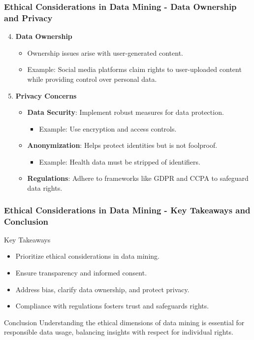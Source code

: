 \documentclass{beamer}
\begin{document}
\begin{frame}[fragile]
    \frametitle{Ethical Considerations in Data Mining - Data Ownership and Privacy}
    \begin{enumerate}
        \setcounter{enumi}{3}
        \item \textbf{Data Ownership}
            \begin{itemize}
                \item Ownership issues arise with user-generated content.
                \item Example: Social media platforms claim rights to user-uploaded content while providing control over personal data.
            \end{itemize}
        \item \textbf{Privacy Concerns}
            \begin{itemize}
                \item \textbf{Data Security}: Implement robust measures for data protection.
                    \begin{itemize}
                        \item Example: Use encryption and access controls.
                    \end{itemize}
                \item \textbf{Anonymization}: Helps protect identities but is not foolproof.
                    \begin{itemize}
                        \item Example: Health data must be stripped of identifiers.
                    \end{itemize}
                \item \textbf{Regulations}: Adhere to frameworks like GDPR and CCPA to safeguard data rights.
            \end{itemize}
    \end{enumerate}
\end{frame}

\begin{frame}[fragile]
    \frametitle{Ethical Considerations in Data Mining - Key Takeaways and Conclusion}
    \begin{block}{Key Takeaways}
        \begin{itemize}
            \item Prioritize ethical considerations in data mining.
            \item Ensure transparency and informed consent.
            \item Address bias, clarify data ownership, and protect privacy.
            \item Compliance with regulations fosters trust and safeguards rights.
        \end{itemize}
    \end{block}
    \begin{block}{Conclusion}
        Understanding the ethical dimensions of data mining is essential for responsible data usage, balancing insights with respect for individual rights.
    \end{block}
\end{frame}
\end{document}
